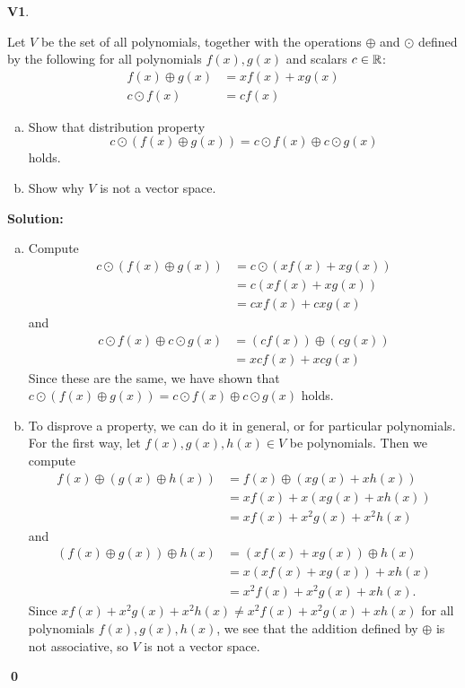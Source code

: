 \documentclass{article}
\newenvironment{problem}[1]
{
  \begin{flushleft}
  \textbf{#1}.
  \ignorespaces
}
{
  \end{flushleft}
}
\newenvironment{solution}
{
  \ignorespaces
  \textbf{Solution:}
}
{
  \ignorespacesafterend
  \begin{flushright}
  {\bfseries \qed}
  \end{flushright}
}
\begin{document}
\begin{problem}{V1}
Let \(V\) be the set of all polynomials, together with the operations
\(\oplus\) and \(\odot\) defined by the following for all polynomials
\(f(x),g(x)\) and scalars \(c \in \mathbb{R}\):
\begin{align*}
f(x) \oplus g(x) &= xf(x)+xg(x) \\
c\odot f(x) &= cf(x)
\end{align*}
\begin{enumerate}[(a)]
\item Show that distribution property
\[c\odot \left(f(x)\oplus g(x) \right) = c \odot f(x) \oplus c \odot g(x)\]
holds.
\item Show why \(V\) is not a vector space.
\end{enumerate}
\end{problem}
\begin{solution}
\begin{enumerate}[(a)]
\item
Compute
\begin{align*}
  c \odot \left(f(x) \oplus g(x) \right)
  &= c \odot \left(xf(x)+xg(x)\right) \\
  &= c\left(xf(x)+xg(x) \right) \\
  &= cxf(x)+cxg(x)
\end{align*}
and
\begin{align*}
  c\odot f(x) \oplus c \odot g(x)
  &= (cf(x)) \oplus (cg(x))\\
  &= xcf(x)+xcg(x)
\end{align*}
Since these are the same, we have shown that
\(c\odot \left(f(x)\oplus g(x) \right) = c \odot f(x) \oplus c \odot g(x)\)
holds.
\item
To disprove a property, we can do it in general, or for particular polynomials. For the first way, 
let \(f(x), g(x), h(x) \in V\) be polynomials. Then we compute
\begin{align*}
f(x)\oplus \left(g(x)\oplus h(x) \right) &= f(x) \oplus \left( xg(x)+xh(x) \right) \\
&= xf(x)+x\left(xg(x)+xh(x)\right) \\
&= xf(x)+x^2g(x)+x^2h(x) 
\end{align*}
and
\begin{align*}
\left(f(x)\oplus g(x)\right) \oplus h(x)  &=  \left( xf(x)+xg(x) \right) \oplus h(x) \\
&= x\left(xf(x)+xg(x)\right)+xh(x) \\
&= x^2f(x)+x^2g(x)+xh(x).
\end{align*}
Since \( xf(x)+x^2g(x)+x^2h(x) \neq x^2f(x)+x^2g(x)+xh(x)\) for all polynomials \(f(x), g(x), h(x)\), we see that 
the addition defined by \(\oplus\) is not associative, so \(V\) is not a vector space.



\end{enumerate}
\end{solution}
\end{document}
